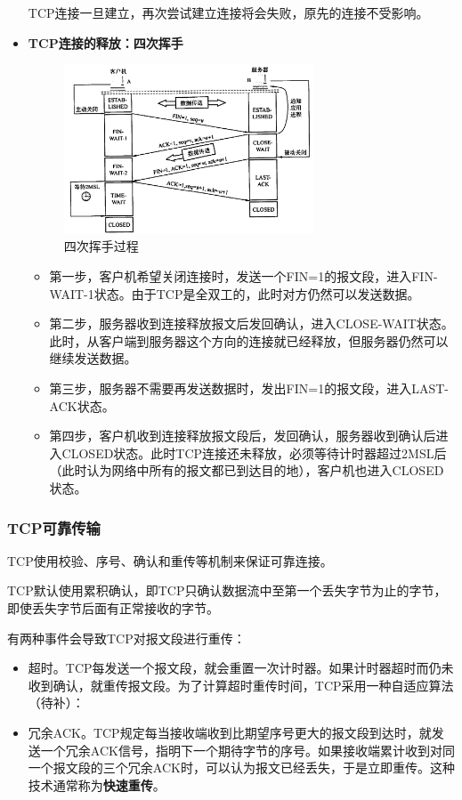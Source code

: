 \documentclass[12pt, a4paper, oneside]{ctexart}
\begin{document}
\begin{itemize}
    TCP连接一旦建立，再次尝试建立连接将会失败，原先的连接不受影响。
    \item {\bf TCP连接的释放：四次挥手}
    \begin{figure}[h]
        \centering
        \includegraphics[width=0.7\textwidth]{./images/tcp_free.png}
        \caption{四次挥手过程}
    \end{figure}
    \begin{itemize}
        \item 第一步，客户机希望关闭连接时，发送一个FIN=1的报文段，进入FIN-WAIT-1状态。由于TCP是全双工的，此时对方仍然可以发送数据。
        \item 第二步，服务器收到连接释放报文后发回确认，进入CLOSE-WAIT状态。此时，从客户端到服务器这个方向的连接就已经释放，但服务器仍然可以继续发送数据。
        \item 第三步，服务器不需要再发送数据时，发出FIN=1的报文段，进入LAST-ACK状态。
        \item 第四步，客户机收到连接释放报文段后，发回确认，服务器收到确认后进入CLOSED状态。此时TCP连接还未释放，必须等待计时器超过2MSL后（此时认为网络中所有的报文都已到达目的地），客户机也进入CLOSED状态。
    \end{itemize}
\end{itemize}

\subsubsection{TCP可靠传输}

TCP使用校验、序号、确认和重传等机制来保证可靠连接。

TCP默认使用累积确认，即TCP只确认数据流中至第一个丢失字节为止的字节，即使丢失字节后面有正常接收的字节。

有两种事件会导致TCP对报文段进行重传：
\begin{itemize}
    \item 超时。TCP每发送一个报文段，就会重置一次计时器。如果计时器超时而仍未收到确认，就重传报文段。为了计算超时重传时间，TCP采用一种自适应算法（待补）：
    \item 冗余ACK。TCP规定每当接收端收到比期望序号更大的报文段到达时，就发送一个冗余ACK信号，指明下一个期待字节的序号。如果接收端累计收到对同一个报文段的三个冗余ACK时，可以认为报文已经丢失，于是立即重传。这种技术通常称为\textbf{快速重传}。
\end{itemize}
\end{document}
